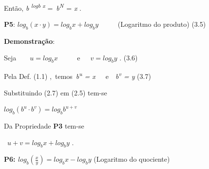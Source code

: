 \documentclass[12pt]{article}
\begin{document}
\begin{enumerate}[label*={\fontsize{14pt}{14pt}\selectfont \textbf{\arabic*.}}]
\begin{justify}
Então, \textit{ }  \textit{b}\textbf{ }\textit{\textsuperscript{logb x}}  =\  \textit{b\textsuperscript{N\  }}= \textit{ x }.
\end{justify}\par


\vspace{\baselineskip}
\begin{justify}
\textbf{P5}: \(  log_{b} \left( x \cdot y \right) =log_{b}x+log_{b}y \) \ \ \  \ \  (Logaritmo do produto) \tab \tab \tab (3.5)
\end{justify}\par

\begin{justify}
\textbf{Demonstração}: 
\end{justify}\par

\begin{justify}
Seja\ \ \ \   \( u=log_{b}x \) \ \ \ \ \ e\ \   \   \( v=log_{b}y \) . \tab \tab \tab \tab \tab (3.6)
\end{justify}\par

\begin{justify}
Pela Def. (1.1) ,\ temos\   \textit{b\textsuperscript{u} = x}\ \ \ e\ \   \textit{b\textsuperscript{v} = y } \tab \tab \tab \tab \tab (3.7)
\end{justify}\par


\vspace{\baselineskip}
\begin{justify}
Substituindo (2.7) em (2.5) tem-se 
\end{justify}\par

\begin{justify}
\tab  \( log_{b} \left( b^{u} \cdot b^{v} \right) =log_{b}b^{u+v} \) 
\end{justify}\par

\begin{justify}
Da Propriedade \textbf{P3} tem-se
\end{justify}\par

\begin{justify}
\  \tab  \( u+v=log_{b}x+log_{b}y \) .
\end{justify}\par


\vspace{\baselineskip}
\begin{justify}
\textbf{P6:  \( log_{b} \left( \frac{x}{y} \right) =log_{b}x-log_{b}y \) }\tab (Logaritmo do quociente)
\end{justify}\par


\end{enumerate}
\end{document}
